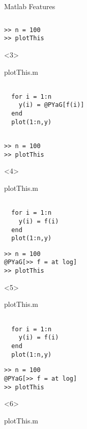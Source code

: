 \begin{frame}[fragile]{Matlab Features}
\begin{columns}
\begin{column}[T]{5cm}
\begin{onlyenv}
\begin{Verbatim}[commandchars=@\[\]]
>> n = 100
>> plotThis
        \end{Verbatim}
      \end{onlyenv}
      \begin{onlyenv}<3>
        \begin{block}{plotThis.m}
          \begin{Verbatim}[commandchars=@\[\]]

  for i = 1:n
    y(i) = @PYaG[f(i)]
  end
  plot(1:n,y)
          \end{Verbatim}
        \end{block}
          \begin{Verbatim}[commandchars=@\[\]]

>> n = 100
>> plotThis
        \end{Verbatim}
      \end{onlyenv}
      \begin{onlyenv}<4>
        \begin{block}{plotThis.m}
          \begin{Verbatim}[commandchars=@\[\]]

  for i = 1:n
    y(i) = f(i)
  end
  plot(1:n,y)
          \end{Verbatim}
        \end{block}
          \begin{Verbatim}[commandchars=@\[\]]
>> n = 100
@PYaG[>> f = at log]
>> plotThis
        \end{Verbatim}
      \end{onlyenv}
      \begin{onlyenv}<5>
        \begin{block}{plotThis.m}
          \begin{Verbatim}[commandchars=@\[\]]

  for i = 1:n
    y(i) = f(i)
  end
  plot(1:n,y)
          \end{Verbatim}
        \end{block}
          \begin{Verbatim}[commandchars=@\[\]]
>> n = 100
@PYaG[>> f = at log]
>> plotThis
        \end{Verbatim}
      \end{onlyenv}
      \begin{onlyenv}<6>
        \begin{block}{plotThis.m}
          \begin{Verbatim}[commandchars=@\[\]]


\end{Verbatim}
\end{block}
\end{onlyenv}
\end{column}
\end{columns}
\end{frame}
